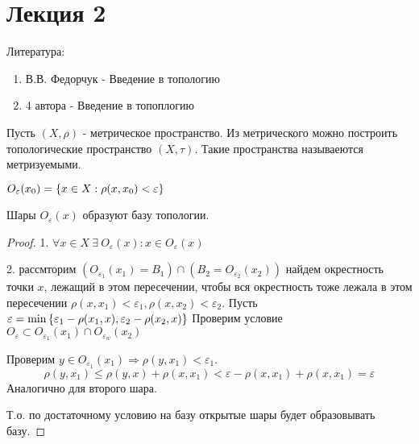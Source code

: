 \section{Лекция 2}

Литература:
\begin{enumerate}
    \item В.В. Федорчук - Введение в топологию
    \item 4 автора - Введение в топоплогию
\end{enumerate}

\begin{definition}
    Пусть $(X, \rho)$ - метрическое пространство. Из метрического можно построить топологические пространство $(X, \tau)$.
    Такие пространства называеются метризуемыми.
\end{definition}

\begin{nota_bene}
\end{nota_bene}

\begin{definition}
    $O_{\varepsilon}(x_0) = \left\{x\in X : \rho(x, x_0) < \varepsilon\right\}$
\end{definition}

\begin{theorem}
    Шары $O_{\varepsilon}(x)$ образуют базу топологии.
\end{theorem}
\begin{proof}
    1. $\forall x \in X \ \exists \ O_{\varepsilon}(x) : x \in O_{\varepsilon}(x)$

    2. рассмторим $(O_{\varepsilon_1}(x_1) = B_1) \cap (B_2 = O_{\varepsilon_2}(x_2))$ найдем окрестность точки $x$, лежащий в этом пересечении, чтобы вся окрестность тоже лежала в этом пересечении
    $\rho(x, x_1) < \varepsilon_1, \rho(x, x_2) < \varepsilon_2$. Пусть $\varepsilon = \min\left\{\varepsilon_1 - \rho(x_1, x), \varepsilon_2 - \rho(x_2, x)\right\}$
    Проверим условие $O_{\varepsilon} \subset O_{\varepsilon_1}(x_1) \cap O_{\varepsilon_w}(x_2)$

    Проверим $y \in O_{\varepsilon_1}(x_1) \Rightarrow \rho(y, x_1) < \varepsilon_1$.
    \[
        \rho(y, x_1) \leq \rho(y, x) + \rho(x, x_1) < \varepsilon - \rho(x, x_1) + \rho(x, x_1) = \varepsilon
    \]
    Аналогично для второго шара.

    Т.о. по достаточному условию на базу открытые шары будет образовывать базу.
\end{proof}


